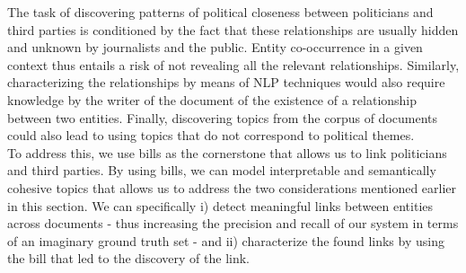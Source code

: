 The task of discovering patterns of political closeness between politicians and third parties is conditioned by the fact that these relationships are usually hidden and unknown by journalists and the public. Entity co-occurrence in a given context thus entails a risk of not revealing all the relevant relationships. Similarly, characterizing the relationships by means of NLP techniques would also require knowledge by the writer of the document of the existence of a relationship between two entities. Finally, discovering topics from the corpus of documents could also lead to using topics that do not correspond to political themes. \\

To address this, we use bills as the cornerstone that allows us to link politicians and third parties. By using bills, we can model interpretable and semantically cohesive topics that allows us to address the two considerations mentioned earlier in this section. We can specifically i) detect meaningful links between entities across documents - thus increasing the precision and recall of our system in terms of an imaginary ground truth set - and ii) characterize the found links by using the bill that led to the discovery of the link.\\ 

